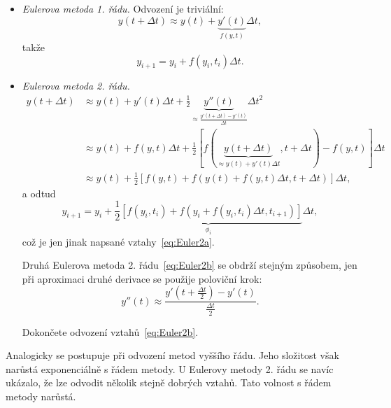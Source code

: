 \documentclass[a4paper,11pt,twoside]{article}
\theoremstyle{red}
\theoremstyle{green}
\begin{document}
    \begin{itemize}
        \item \emph{Eulerova metoda 1. řádu.} Odvození je triviální:
            \begin{equation}
                y(t+\Delta t)\approx y(t)+\underbrace{y'(t)}_{f(y,t)}\Delta t,
            \end{equation}
            takže
            \begin{equation}
                y_{i+1}=y_{i}+f(y_{i},t_{i})\Delta t.
            \end{equation}
        \item \emph{Eulerova metoda 2. řádu.}
            \begin{align}
                y(t+\Delta t)
                    &\approx y(t)+y'(t)\Delta t+\frac{1}{2}\underbrace{y''(t)}_{\approx\frac{y'(t+\Delta t)-y'(t)}{\Delta t}}\Delta t^{2}\nonumber\\
                    &\approx y(t)+f(y,t)\Delta t+\frac{1}{2}[f(\underbrace{y(t+\Delta t)}_{\approx y(t)+y'(t)\Delta t},t+\Delta t)-f(y,t)]\Delta t\nonumber\\
                    &\approx y(t)+\frac{1}{2}\left[f(y,t)+f(y(t)+f(y,t)\Delta t,t+\Delta t)\right]\Delta t,
            \end{align}
            a odtud
            \begin{equation}
                y_{i+1}=y_{i}+\underbrace{\frac{1}{2}\left[f(y_{i},t_{i})+f(y_{i}+f(y_{i},t_{i})\Delta t,t_{i+1})\right]}_{\phi_{i}}\Delta t,
            \end{equation}
            což je jen jinak napsané vztahy~\eqref{eq:Euler2a}.

            Druhá Eulerova metoda 2. řádu~\eqref{eq:Euler2b} se obdrží stejným způsobem, jen při aproximaci druhé derivace se použije poloviční krok:
            \begin{equation}
                y''(t)\approx\frac{y'\left(t+\frac{\Delta t}{2}\right)-y'(t)}{\frac{\Delta t}{2}}.
            \end{equation}

            \begin{voluntary}
                Dokončete odvození vztahů~\eqref{eq:Euler2b}.
            \end{voluntary}            
    \end{itemize}

    Analogicky se postupuje při odvození metod vyššího řádu.
    Jeho složitost však narůstá exponenciálně s řádem metody.
    U Eulerovy metody 2. řádu se navíc ukázalo, že lze odvodit několik stejně dobrých vztahů.
    Tato volnost s řádem metody narůstá.
\end{document}
